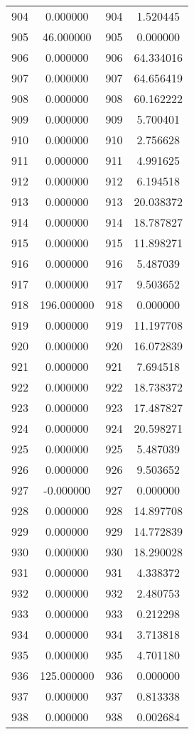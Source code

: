 \documentclass[12pt]{article}
\begin{document}
\begin{longtable}{@{}cccc@{}}
904 & 0.000000 & 904 & 1.520445 \\
905 & 46.000000 & 905 & 0.000000 \\
906 & 0.000000 & 906 & 64.334016 \\
907 & 0.000000 & 907 & 64.656419 \\
908 & 0.000000 & 908 & 60.162222 \\
909 & 0.000000 & 909 & 5.700401 \\
910 & 0.000000 & 910 & 2.756628 \\
911 & 0.000000 & 911 & 4.991625 \\
912 & 0.000000 & 912 & 6.194518 \\
913 & 0.000000 & 913 & 20.038372 \\
914 & 0.000000 & 914 & 18.787827 \\
915 & 0.000000 & 915 & 11.898271 \\
916 & 0.000000 & 916 & 5.487039 \\
917 & 0.000000 & 917 & 9.503652 \\
918 & 196.000000 & 918 & 0.000000 \\
919 & 0.000000 & 919 & 11.197708 \\
920 & 0.000000 & 920 & 16.072839 \\
921 & 0.000000 & 921 & 7.694518 \\
922 & 0.000000 & 922 & 18.738372 \\
923 & 0.000000 & 923 & 17.487827 \\
924 & 0.000000 & 924 & 20.598271 \\
925 & 0.000000 & 925 & 5.487039 \\
926 & 0.000000 & 926 & 9.503652 \\
927 & -0.000000 & 927 & 0.000000 \\
928 & 0.000000 & 928 & 14.897708 \\
929 & 0.000000 & 929 & 14.772839 \\
930 & 0.000000 & 930 & 18.290028 \\
931 & 0.000000 & 931 & 4.338372 \\
932 & 0.000000 & 932 & 2.480753 \\
933 & 0.000000 & 933 & 0.212298 \\
934 & 0.000000 & 934 & 3.713818 \\
935 & 0.000000 & 935 & 4.701180 \\
936 & 125.000000 & 936 & 0.000000 \\
937 & 0.000000 & 937 & 0.813338 \\
938 & 0.000000 & 938 & 0.002684 \\

\end{longtable}
\end{document}
